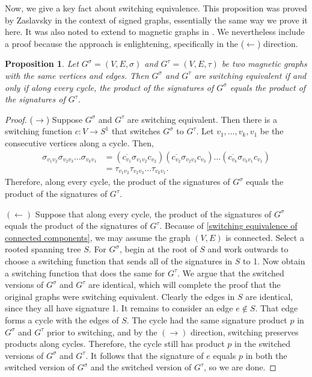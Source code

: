 \documentclass{article}
\newtheorem{prop}[thm]{Proposition}
\theoremstyle{definition}
\begin{document}
Now, we give a key fact about switching equivalence. This proposition was proved by Zaslavsky \cite{zaslavsky} in the context of signed graphs, essentially the same way we prove it here. It was also noted to extend to magnetic graphs in \cite{liu}. We nevertheless include a proof because the approach is enlightening, specifically in the ($\leftarrow$) direction.

\begin{prop}\label{closed walk characterization of switching equivalence}
    Let $G^\sigma = (V, E, \sigma)$ and $G^\tau = (V, E, \tau)$ be two magnetic graphs with the same vertices and edges. Then $G^\sigma$ and $G^\tau$ are switching equivalent if and only if along every cycle, the product of the signatures of $G^\sigma$ equals the product of the signatures of $G^\tau$.
\end{prop}
\begin{proof}
    ($\rightarrow$) Suppose $G^\sigma$ and $G^\tau$ are switching equivalent. Then there is a switching function $c: V \rightarrow S^1$ that switches $G^\sigma$ to $G^\tau$. Let $v_1, \dots, v_k, v_1$ be the consecutive vertices along a cycle. Then,
    \begin{align*}
        \sigma_{v_1 v_2} \sigma_{v_2 v_3} \dots \sigma_{v_{k} v_1}
        &= (\overline{c_{v_1}} \sigma_{v_1 v_2} c_{v_2}) (\overline{c_{v_2}} \sigma_{v_2 v_3} c_{v_3}) \dots (\overline{c_{v_k}} \sigma_{v_k v_1} c_{v_1}) \\
        &= \tau_{v_1 v_2} \tau_{v_2 v_3} \dots \tau_{v_{k} v_1}.
    \end{align*} 
    Therefore, along every cycle, the product of the signatures of $G^\sigma$ equals the product of the signatures of $G^\tau$.
    
    $(\leftarrow)$ Suppose that along every cycle, the product of the signatures of $G^\sigma$ equals the product of the signatures of $G^\tau$. Because of \cref{switching equivalence of connected components}, we may assume the graph $(V, E)$ is connected. Select a rooted spanning tree $S$. For $G^\sigma$, begin at the root of $S$ and work outwards to choose a switching function that sends all of the signatures in $S$ to 1. Now obtain a switching function that does the same for $G^\tau$. We argue that the switched versions of $G^\sigma$ and $G^\tau$ are identical, which will complete the proof that the original graphs were switching equivalent. Clearly the edges in $S$ are identical, since they all have signature 1. It remains to consider an edge $e \notin S$. That edge forms a cycle with the edges of $S$. The cycle had the same signature product $p$ in $G^\sigma$ and $G^\tau$ prior to switching, and by the $(\rightarrow)$ direction, switching preserves products along cycles. Therefore, the cycle still has product $p$ in the switched versions of $G^\sigma$ and $G^\tau$. It follows that the signature of $e$ equals $p$ in both the switched version of $G^\sigma$ and the switched version of $G^\tau$, so we are done.  
\end{proof}
\end{document}

